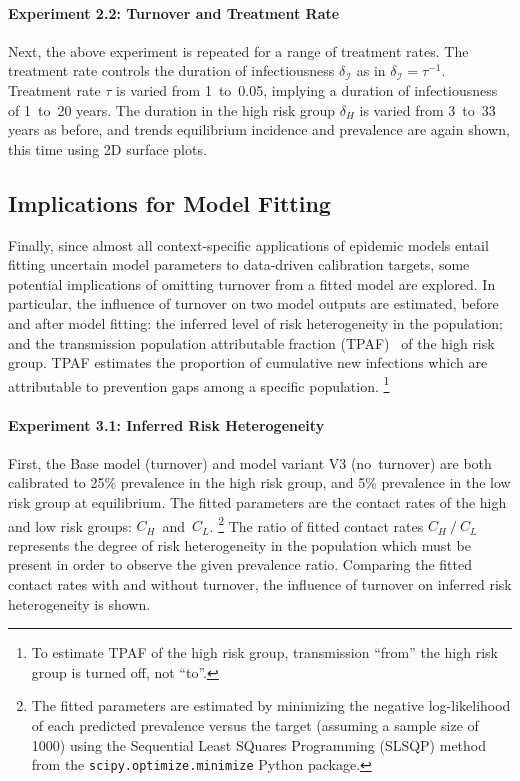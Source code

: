 \paragraph{Experiment 2.2: Turnover and Treatment Rate}
Next, the above experiment is repeated for a range of treatment rates.
The treatment rate controls the duration of infectiousness $\delta_{\mathcal{I}}$
as in $\delta_{\mathcal{I}} = \tau^{-1}$.
Treatment rate $\tau$ is varied from 1~to~0.05,
implying a duration of infectiousness of 1~to~20 years.
The duration in the high risk group $\delta_H$ is varied from 3~to~33 years as before,
and trends equilibrium incidence and prevalence are again shown,
this time using 2D surface plots.
\subsection{Implications for Model Fitting}\label{ss:exp-turnover-fit}
Finally, since almost all context-specific applications of epidemic models entail
fitting uncertain model parameters to data-driven calibration targets,
some potential implications of omitting turnover from a fitted model are explored.
In particular, the influence of turnover on two model outputs are estimated,
before and after model fitting:
the inferred level of risk heterogeneity in the population;
and the transmission population attributable fraction (TPAF)~\citep{Mishra2016}
of the high risk group.
TPAF estimates the proportion of cumulative new infections which are attributable to
prevention gaps among a specific population.%
\footnote{To estimate TPAF of the high risk group,
  transmission ``from'' the high risk group is turned off, not ``to''.}
\paragraph{Experiment 3.1: Inferred Risk Heterogeneity}
First, the Base model (turnover) and model variant V3 (no~turnover) are both calibrated to
25\% prevalence in the high risk group, and
5\% prevalence in the low risk group at equilibrium.
The fitted parameters are
the contact rates of the high and low risk groups: $C_H$~and~$C_L$.%
\footnote{The fitted parameters are estimated by minimizing
  the negative log-likelihood of each predicted prevalence versus the target
  (assuming a sample size of 1000)
  using the Sequential Least SQuares Programming (SLSQP) method~\citep{Kraft1988}
  from the \texttt{scipy.optimize.minimize} Python package.}
The ratio of fitted contact rates $C_H~/~C_L$
represents the degree of risk heterogeneity in the population
which must be present in order to observe the given prevalence ratio.
Comparing the fitted contact rates with and without turnover,
the influence of turnover on inferred risk heterogeneity is shown.
